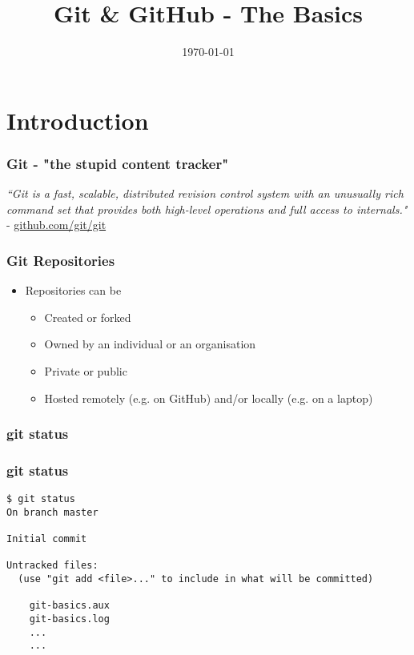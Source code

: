\documentclass{beamer}
\title[Git]{Git \& GitHub - The Basics} %
\author{} %
\institute[] %
{
 \\ %
\medskip
\textit{chris@cjwfuller.com}
}
\date{\today}
\begin{document}
\begin{frame}
\titlepage
\end{frame}

\section{Introduction}

\begin{frame}
\frametitle{Git - "the stupid content tracker"}
\textit{``Git is a fast, scalable, distributed revision control system with an unusually rich command set that provides both high-level operations and full access to internals."} - \url{github.com/git/git}
\end{frame}


\begin{frame}
\frametitle{Git Repositories}
\begin{itemize}
	\item Repositories can be
	\begin{itemize}
		\item Created or forked
		\item Owned by an individual or an organisation
		\item Private or public
		\item Hosted remotely (e.g. on GitHub) and/or locally (e.g. on a laptop)
	\end{itemize}
\end{itemize}
\end{frame}


\begin{frame}
\frametitle{git status}

\end{frame}


\begin{frame}[fragile]
\frametitle{git status}
	\scriptsize
	\begin{verbatim}
$ git status
On branch master

Initial commit

Untracked files:
  (use "git add <file>..." to include in what will be committed)

	git-basics.aux
	git-basics.log
	...
	...
	\end{verbatim}
\end{frame}
\end{document}
